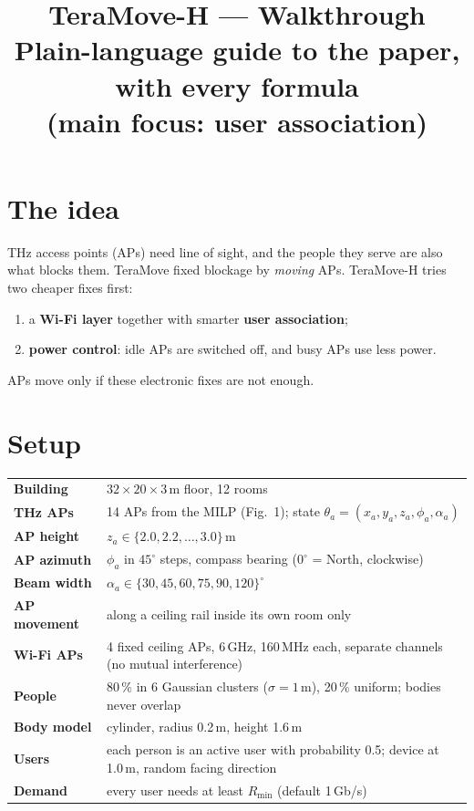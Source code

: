 \documentclass[11pt,a4paper]{article}
\title{\textbf{TeraMove-H --- Walkthrough}\\[4pt]
\large Plain-language guide to the paper, with every formula\\
\normalsize (main focus: user association)}
\date{}
\newcommand{\Rmin}{R_{\min}}
\begin{document}
\maketitle
\vspace{-1.5em}
\tableofcontents
\bigskip

\section{The idea}
THz access points (APs) need line of sight, and the people they serve are also what blocks
them. TeraMove fixed blockage by \emph{moving} APs. TeraMove-H tries two cheaper fixes first:
\begin{enumerate}
\item a \textbf{Wi-Fi layer} together with smarter \textbf{user association};
\item \textbf{power control}: idle APs are switched off, and busy APs use less power.
\end{enumerate}
APs move only if these electronic fixes are not enough.

\section{Setup}
\begin{center}
\begin{tabular}{@{}>{\bfseries}l p{}@{}}
\toprule
Building & $32\times20\times3$\,m floor, 12 rooms\\
THz APs & 14 APs from the MILP (Fig.~1); state $\theta_a=(x_a,y_a,z_a,\phi_a,\alpha_a)$\\
AP height & $z_a\in\{2.0,2.2,\dots,3.0\}$\,m\\
AP azimuth & $\phi_a$ in $45^\circ$ steps, compass bearing ($0^\circ$ = North, clockwise)\\
Beam width & $\alpha_a\in\{30,45,60,75,90,120\}^\circ$\\
AP movement & along a ceiling rail inside its own room only\\
Wi-Fi APs & 4 fixed ceiling APs, 6\,GHz, 160\,MHz each, separate channels (no mutual interference)\\
People & 80\,\% in 6 Gaussian clusters ($\sigma=1$\,m), 20\,\% uniform; bodies never overlap\\
Body model & cylinder, radius 0.2\,m, height 1.6\,m\\
Users & each person is an active user with probability 0.5; device at 1.0\,m, random facing direction\\
Demand & every user needs at least $\Rmin$ (default 1\,Gb/s)\\
\bottomrule
\end{tabular}
\end{center}
\end{document}

